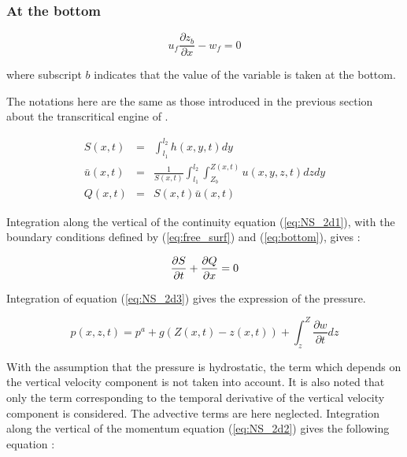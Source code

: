 \subsubsection{At the bottom}

\begin{equation}
 u_f \frac{\partial z_b}{\partial x}-w_f = 0
 \label{eq:bottom}
\end{equation}

where subscript $b$ indicates that the value of the variable is taken at the bottom.

The notations here are the same as those introduced in the previous section about the transcritical engine of \mascaret{}.

\begin{eqnarray}
 S(x,t) & = & \int_{l_{1}}^{l_{2}}h(x,y,t)dy \\
 \bar{u}(x,t) & = & \frac{1}{S(x,t)}\int_{l_{1}}^{l_{2}}\int_{Z_{b}}^{Z(x,t)}u(x,y,z,t)dzdy \\
 Q(x,t) & = & S(x,t)\bar{u}(x,t)
\end{eqnarray}

Integration along the vertical of the continuity equation (\ref{eq:NS_2d1}), with the boundary conditions defined by (\ref{eq:free_surf}) and (\ref{eq:bottom}), gives :

\begin{equation}
  \frac{\partial{S}}{\partial{t}}+\frac{\partial{Q}}{\partial{x}}=0 \label{eq:STV_1d1}\\
\end{equation}

Integration of equation (\ref{eq:NS_2d3}) gives the expression of the pressure.

\begin{equation}
  p(x,z,t)=p^{a}+g(Z(x,t)-z(x,t))+\int_{z}^{Z}{\frac{\partial{w}}{\partial{t}}}dz
\end{equation}

With the assumption that the pressure is hydrostatic, the term which depends on the vertical velocity component is not taken into account. It is also noted that only the term corresponding to the temporal derivative of the vertical velocity component is considered. The advective terms are here neglected. Integration along the vertical of the momentum equation (\ref{eq:NS_2d2}) gives the following equation :

